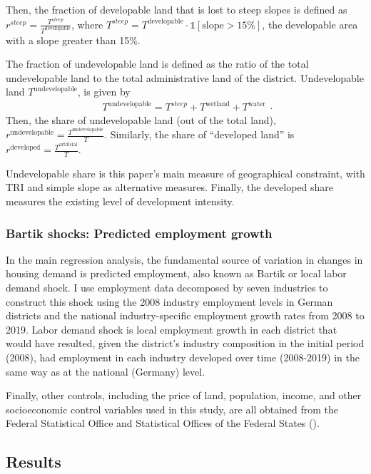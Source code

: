 \documentclass[
  12pt,
]{article}
\begin{document}
Then, the fraction of developable land that is lost to steep slopes is defined as \(r^{steep} = \frac{T^{steep}}{T^{\text{developable}}}\), where \(T^{steep} = T^{\text{developable}} \cdot\mathbb{1}\left[{\text{slope} > 15\%}\right]\), the developable area with a slope greater than 15\%.

The fraction of undevelopable land is defined as the ratio of the total undevelopable land to the total administrative land of the district. Undevelopable land \(T^{\text{undevelopable}}\), is given by \[
\begin{aligned}
T^{\text{undevelopable}} = T^{steep} + T^{\text{wetland}} + T^{\text{water}}
\end{aligned}.
\] Then, the share of undevelopable land (out of the total land), \(r^{\text{undevelopable}} = \frac{T^{\text{undevelopable}}}{T}\). Similarly, the share of ``developed land'' is \(r^{\text{developed}} = \frac{T^{\text{artificial}}}{T}\).

Undevelopable share is this paper's main measure of geographical constraint, with TRI and simple slope as alternative measures. Finally, the developed share measures the existing level of development intensity.

\subsubsection{Bartik shocks: Predicted employment growth}\label{bartik-shocks-predicted-employment-growth}

In the main regression analysis, the fundamental source of variation in changes in housing demand is predicted employment, also known as Bartik or local labor demand shock. I use employment data decomposed by seven industries to construct this shock using the 2008 industry employment levels in German districts and the national industry-specific employment growth rates from 2008 to 2019. Labor demand shock is local employment growth in each district that would have resulted, given the district's industry composition in the initial period (2008), had employment in each industry developed over time (2008-2019) in the same way as at the national (Germany) level.

Finally, other controls, including the price of land, population, income, and other socioeconomic control variables used in this study, are all obtained from the Federal Statistical Office and Statistical Offices of the Federal States ().

\subsection{Results}\label{results}
\end{document}
